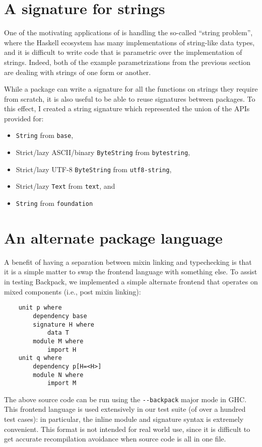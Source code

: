 \section{A signature for strings}

One of the motivating applications of \Backpack{} is handling the
so-called ``string problem'', where the Haskell ecosystem has
many implementations of string-like data types, and it is difficult
to write code that is parametric over the implementation of strings.
Indeed, both of the example parametrizations from the previous section
are dealing with strings of one form or another.

While a package can write a signature for all the functions on strings they
require from scratch, it is also useful to be able to reuse signatures
between packages.  To this effect, I created a string signature which
represented the union of the APIs provided for:

\begin{itemize}
    \item \verb|String| from \verb|base|,
    \item Strict/lazy ASCII/binary \verb|ByteString| from \verb|bytestring|,
    \item Strict/lazy UTF-8 \verb|ByteString| from \verb|utf8-string|,
    \item Strict/lazy \verb|Text| from \verb|text|, and
    \item \verb|String| from \verb|foundation|
\end{itemize}


\section{An alternate package language}

A benefit of having a separation between mixin linking and typechecking
is that it is a simple matter to swap the frontend language with
something else.  To assist in testing Backpack, we implemented a simple
alternate frontend that operates on mixed components (i.e., post mixin
linking):

\begin{verbatim}
    unit p where
        dependency base
        signature H where
            data T
        module M where
            import H
    unit q where
        dependency p[H=<H>]
        module N where
            import M
\end{verbatim}
%
The above source code can be run using the \verb|--backpack| major mode
in GHC\@.  This frontend language is used extensively in our test suite
(of over a hundred test cases): in particular, the inline module and
signature syntax is extremely convenient.  This format is not intended
for real world use, since it is difficult to get accurate recompilation
avoidance when source code is all in one file.
